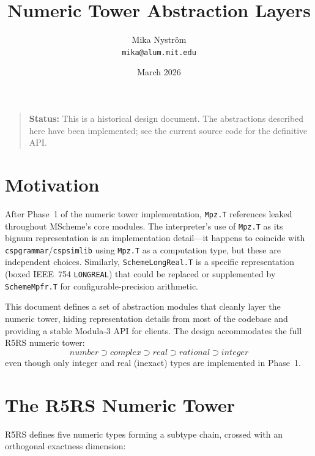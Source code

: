 \documentclass[12pt]{article}
\title{\bfseries\sffamily\fontsize{24.88}{30}\selectfont
  Numeric Tower Abstraction Layers}
\author{Mika Nystr\"om \\ {\tt mika@alum.mit.edu}}
\date{March 2026}
\begin{document}
\maketitle
\thispagestyle{empty}

\begin{quote}
\textbf{Status:} This is a historical design document.
The abstractions described here have been implemented;
see the current source code for the definitive API.
\end{quote}

\newpage
\tableofcontents
\newpage

\section{Motivation}
\label{sec:motivation}

After Phase~1 of the numeric tower implementation, {\tt Mpz.T}
references leaked throughout MScheme's core modules.  The
interpreter's use of {\tt Mpz.T} as its bignum representation is
an implementation detail---it happens to coincide with
{\tt cspgrammar}/{\tt cspsimlib} using {\tt Mpz.T} as a
computation type, but these are independent choices.  Similarly,
{\tt SchemeLongReal.T} is a specific representation (boxed IEEE~754
{\tt LONGREAL}) that could be replaced or supplemented by
{\tt SchemeMpfr.T} for configurable-precision arithmetic.

This document defines a set of abstraction modules that cleanly
layer the numeric tower, hiding representation details from most
of the codebase and providing a stable Modula-3 API for clients.
The design accommodates the full R5RS numeric tower:
\[
  \mathit{number} \supset \mathit{complex} \supset \mathit{real}
  \supset \mathit{rational} \supset \mathit{integer}
\]
even though only integer and real (inexact) types are implemented
in Phase~1.

\section{The R5RS Numeric Tower}
\label{sec:r5rs-tower}

R5RS defines five numeric types forming a subtype chain, crossed
with an orthogonal exactness dimension:
\end{document}
